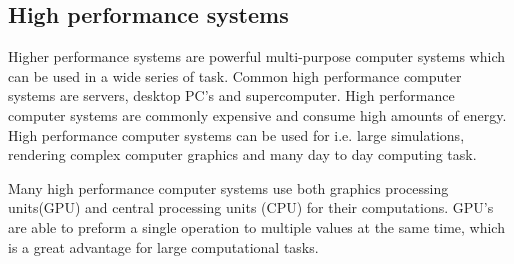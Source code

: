 \documentclass[10pt]{article}
\begin{document}
\subsection{High performance systems}
Higher performance systems are powerful multi-purpose computer systems which can be used in a wide series of task. Common high performance computer systems are servers, desktop PC's and supercomputer. High performance computer systems are commonly expensive and consume high amounts of energy. High performance computer systems can be used for i.e. large simulations, rendering complex computer graphics and many day to day computing task.

Many high performance computer systems use both graphics processing units(GPU) and central processing units (CPU) for their computations. GPU's are able to preform a single operation to multiple values at the same time, which is a great advantage for large computational tasks.
\end{document}
